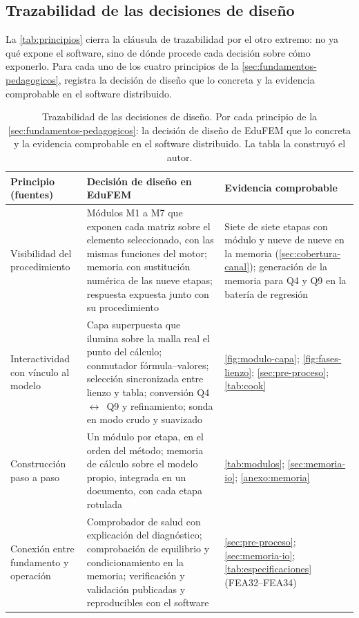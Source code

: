 \subsection{Trazabilidad de las decisiones de diseño}
\label{sec:trazabilidad-diseno}

La \autoref{tab:principios} cierra la cláusula de trazabilidad por el otro extremo: no ya qué expone el software, sino de dónde procede cada decisión sobre cómo exponerlo. Para cada uno de los cuatro principios de la \autoref{sec:fundamentos-pedagogicos}, registra la decisión de diseño que lo concreta y la evidencia comprobable en el software distribuido.

\begin{table}[htbp]
\centering
\caption[Principios, decisiones de diseño y evidencia.]{Trazabilidad de las decisiones de diseño. Por cada principio de la \autoref{sec:fundamentos-pedagogicos}: la decisión de diseño de EduFEM que lo concreta y la evidencia comprobable en el software distribuido. La tabla la construyó el autor.}
\label{tab:principios}
{\footnotesize
\setlength{\tabcolsep}{3pt}
\renewcommand{\arraystretch}{1.12}
\begin{tabular}{@{}>{\raggedright\arraybackslash}p{3.4cm}>{\raggedright\arraybackslash}p{5.6cm}>{\raggedright\arraybackslash}p{5.4cm}@{}}
\toprule
\textbf{Principio (fuentes)} & \textbf{Decisión de diseño en EduFEM} & \textbf{Evidencia comprobable} \\
\midrule
Visibilidad del procedimiento \autocite[p.~157]{lee2015interactive} & Módulos M1 a M7 que exponen cada matriz sobre el elemento seleccionado, con las mismas funciones del motor; memoria con sustitución numérica de las nueve etapas; respuesta expuesta junto con su procedimiento & Siete de siete etapas con módulo y nueve de nueve en la memoria (\autoref{sec:cobertura-canal}); generación de la memoria para Q4 y Q9 en la batería de regresión \\
Interactividad con vínculo al modelo \autocite[pp.~163, 166]{lee2015interactive} & Capa superpuesta que ilumina sobre la malla real el punto del cálculo; conmutador fórmula--valores; selección sincronizada entre lienzo y tabla; conversión Q4~$\leftrightarrow$~Q9 y refinamiento; sonda en modo crudo y suavizado & \autoref{fig:modulo-capa}; \autoref{fig:fases-lienzo}; \autoref{sec:pre-proceso}; \autoref{tab:cook} \\
Construcción paso a paso \autocite[pp.~1010-1011, 1023]{bishay2020teaching} & Un módulo por etapa, en el orden del método; memoria de cálculo sobre el modelo propio, integrada en un documento, con cada etapa rotulada & \autoref{tab:modulos}; \autoref{sec:memoria-io}; \autoref{anexo:memoria} \\
Conexión entre fundamento y operación \autocite[pp.~1159, 1168]{perezsantiago2023fem} & Comprobador de salud con explicación del diagnóstico; comprobación de equilibrio y condicionamiento en la memoria; verificación y validación publicadas y reproducibles con el software & \autoref{sec:pre-proceso}; \autoref{sec:memoria-io}; \autoref{tab:especificaciones} (FEA32--FEA34) \\
\bottomrule
\end{tabular}}
\end{table}

